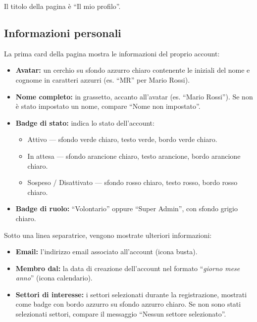 \documentclass[a4paper,11pt,oneside]{book}
\begin{document}
Il titolo della pagina \`e ``Il mio profilo''.

\subsection{Informazioni personali}
\label{sec:profilo-info}

La prima card della pagina mostra le informazioni del proprio account:

\begin{itemize}[leftmargin=1.5em]
  \item \textbf{Avatar:} un cerchio su sfondo \textcolor{namoCyan}{azzurro} chiaro contenente le iniziali del nome e cognome in caratteri \textcolor{namoCyan}{azzurri} (es. ``MR'' per Mario Rossi).
  \item \textbf{Nome completo:} in grassetto, accanto all'avatar (es. ``Mario Rossi''). Se non \`e stato impostato un nome, compare ``Nome non impostato''.
  \item \textbf{Badge di stato:} indica lo stato dell'account:
    \begin{itemize}
      \item \textcolor{namoGreen}{Attivo} --- sfondo verde chiaro, testo verde, bordo verde chiaro.
      \item \textcolor{namoOrange}{In attesa} --- sfondo arancione chiaro, testo arancione, bordo arancione chiaro.
      \item \textcolor{namoRed}{Sospeso / Disattivato} --- sfondo rosso chiaro, testo rosso, bordo rosso chiaro.
    \end{itemize}
  \item \textbf{Badge di ruolo:} ``Volontario'' oppure ``Super Admin'', con sfondo grigio chiaro.
\end{itemize}

Sotto una linea separatrice, vengono mostrate ulteriori informazioni:

\begin{itemize}[leftmargin=1.5em]
  \item \textbf{Email:} l'indirizzo email associato all'account (icona busta).
  \item \textbf{Membro dal:} la data di creazione dell'account nel formato ``\textit{giorno mese anno}'' (icona calendario).
  \item \textbf{Settori di interesse:} i settori selezionati durante la registrazione, mostrati come badge con bordo \textcolor{namoCyan}{azzurro} su sfondo azzurro chiaro. Se non sono stati selezionati settori, compare il messaggio ``Nessun settore selezionato''.
\end{itemize}
\end{document}
